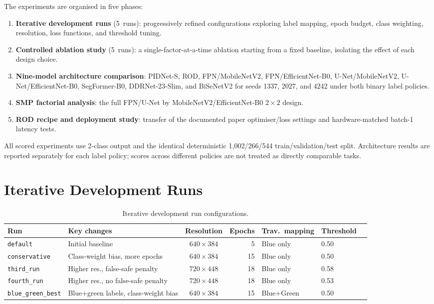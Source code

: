 \documentclass[12pt,a4paper]{report}
\begin{document}
The experiments are organised in five phases:
\begin{enumerate}[nosep]
  \item \textbf{Iterative development runs} (5~runs): progressively refined configurations exploring label mapping, epoch budget, class weighting, resolution, loss functions, and threshold tuning.
  \item \textbf{Controlled ablation study} (5~runs): a single-factor-at-a-time ablation starting from a fixed baseline, isolating the effect of each design choice.
  \item \textbf{Nine-model architecture comparison}: PIDNet-S, ROD,
  FPN/MobileNetV2, FPN/EfficientNet-B0, U-Net/MobileNetV2,
  U-Net/EfficientNet-B0, SegFormer-B0, DDRNet-23-Slim, and BiSeNetV2 for seeds
  1337, 2027, and 4242 under both binary label policies.
  \item \textbf{SMP factorial analysis}: the full FPN/U-Net by
  MobileNetV2/EfficientNet-B0 $2\times2$ design.
  \item \textbf{ROD recipe and deployment study}: transfer of the documented
  paper optimiser/loss settings and hardware-matched batch-1 latency tests.
\end{enumerate}
All scored experiments use 2-class output and the identical deterministic
1{,}002/266/544 train/validation/test split. Architecture results are reported
separately for each label policy; scores across different policies are not
treated as directly comparable tasks.

\section{Iterative Development Runs}

\begin{table}[H]
\centering
\caption{Iterative development run configurations.}
\label{tab:iterative_configs}
\small
\begin{tabular}{@{}llcrll r@{}}
\toprule
\textbf{Run} & \textbf{Key changes} & \textbf{Resolution} & \textbf{Epochs} & \textbf{Trav.\ mapping} & \textbf{Threshold} \\
\midrule
\texttt{default}           & Initial baseline                     & $640\times384$ & 5  & Blue only  & 0.50 \\
\texttt{conservative}      & Class-weight bias, more epochs        & $640\times384$ & 15 & Blue only  & 0.50 \\
\texttt{third\_run}        & Higher res., false-safe penalty       & $720\times448$ & 18 & Blue only  & 0.58 \\
\texttt{fourth\_run}       & Higher res., no false-safe penalty    & $720\times448$ & 18 & Blue only  & 0.53 \\
\texttt{blue\_green\_best} & Blue+green labels, class-weight bias  & $640\times384$ & 15 & Blue+Green & 0.50 \\
\bottomrule
\end{tabular}
\end{table}
\end{document}
